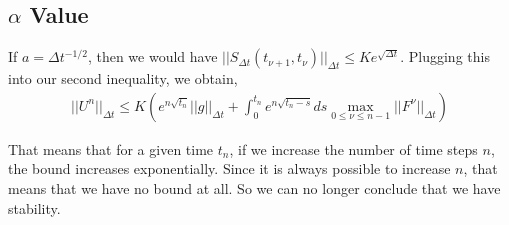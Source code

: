 \subsection{$\alpha$ Value}
If $a = \Delta t^{-1/2}$, then we would have $||S_{\Delta t}(t_{\nu + 1}, t_{\nu})||_{\Delta t} \leq Ke^{\sqrt{\Delta t}}$. Plugging this into our second inequality, we obtain, 
\begin{align*}
||U^n||_{\Delta t}\leq K(e^{n\sqrt{t_n}}||g||_{\Delta t}+ \int_0^{t_n} e^{n\sqrt{t_n - s}} ds \max_{0\leq \nu \leq n-1} ||F^{\nu}||_{\Delta t})
\end{align*}

That means that for a given time $t_n$, if we increase the number of time steps $n$, the bound increases exponentially. Since it is always possible to increase $n$, that means that we have no bound at all. So we can no longer conclude that we have stability. 
